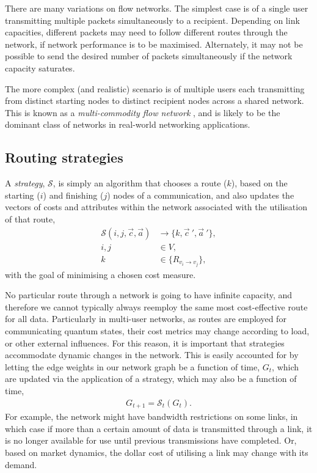 \documentclass[aps,rmp,twocolumn,amsmath,amssymb,nofootinbib,superscriptaddress,longbibliography,floatfix,table-of-contents,eqsecnum]{revtex4-1}
\begin{document}
There are many variations on flow networks. The simplest case is of a single user transmitting multiple packets simultaneously to a recipient. Depending on link capacities, different packets may need to follow different routes through the network, if network performance is to be maximised. Alternately, it may not be possible to send the desired number of packets simultaneously if the network capacity saturates.

The more complex (and realistic) scenario is of multiple users each transmitting from distinct starting nodes to distinct recipient nodes across a shared network. This is known as a \textit{multi-commodity flow network} \cite{???}, and is likely to be the dominant class of networks in real-world networking applications.

%
%

\subsection{Routing strategies} \label{sec:route_strats} 

A \textit{strategy}, $\mathcal{S}$, is simply an algorithm that chooses a route ($k$), based on the starting ($i$) and finishing ($j$) nodes of a communication, and also updates the vectors of costs and attributes within the network associated with the utilisation of that route,
\begin{align}
\mathcal{S}(i,j,\vec{c},\vec{a}) &\to \{k,{\vec{c}}~',{\vec{a}}~'\}, \nonumber \\
i,j &\in V, \nonumber\\
k &\in \{R_{v_i\to v_j}\},
\end{align}
with the goal of minimising a chosen cost measure.

No particular route through a network is going to have infinite capacity, and therefore we cannot typically always reemploy the same most cost-effective route for all data. Particularly in multi-user networks, as routes are employed for communicating quantum states, their cost metrics may change according to load, or other external influences. For this reason, it is important that strategies accommodate dynamic changes in the network. This is easily accounted for by letting the edge weights in our network graph be a function of time, $G_t$, which are updated via the application of a strategy, which may also be a function of time,
\begin{align} \label{eq:S_G}
G_{t+1} = \mathcal{S}_t(G_t).
\end{align}
For example, the network might have bandwidth restrictions on some links, in which case if more than a certain amount of data is transmitted through a link, it is no longer available for use until previous transmissions have completed. Or, based on market dynamics, the dollar cost of utilising a link may change with its demand.
\end{document}
